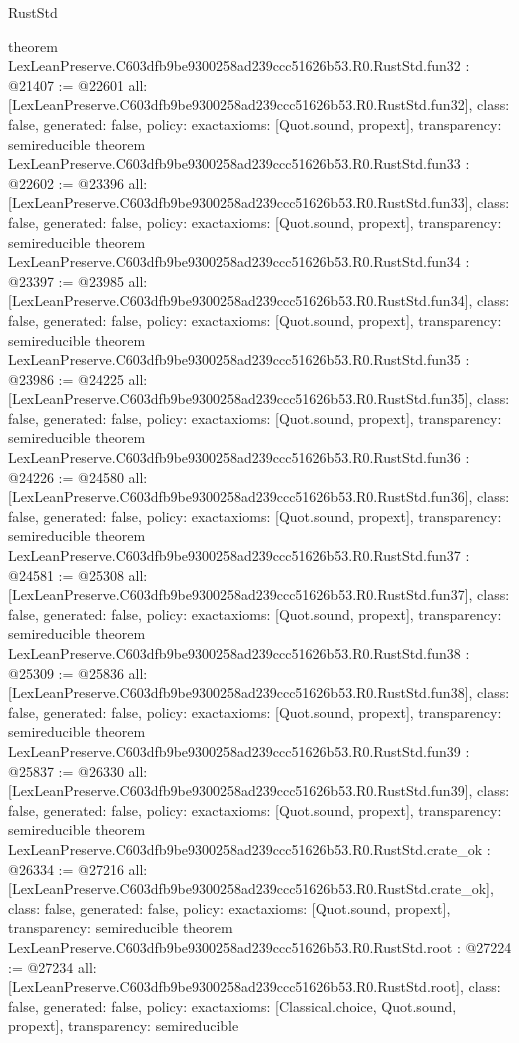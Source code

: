 \begin{lexlean}{RustStd}
\begin{coremodule}
{}
theorem LexLeanPreserve.C603dfb9be9300258ad239ccc51626b53.R0.RustStd.fun32 : @21407 := @22601 {
  all: [LexLeanPreserve.C603dfb9be9300258ad239ccc51626b53.R0.RustStd.fun32],
  class: false,
  generated: false,
  policy: exact{axioms: [Quot.sound, propext]},
  transparency: semireducible
}
theorem LexLeanPreserve.C603dfb9be9300258ad239ccc51626b53.R0.RustStd.fun33 : @22602 := @23396 {
  all: [LexLeanPreserve.C603dfb9be9300258ad239ccc51626b53.R0.RustStd.fun33],
  class: false,
  generated: false,
  policy: exact{axioms: [Quot.sound, propext]},
  transparency: semireducible
}
theorem LexLeanPreserve.C603dfb9be9300258ad239ccc51626b53.R0.RustStd.fun34 : @23397 := @23985 {
  all: [LexLeanPreserve.C603dfb9be9300258ad239ccc51626b53.R0.RustStd.fun34],
  class: false,
  generated: false,
  policy: exact{axioms: [Quot.sound, propext]},
  transparency: semireducible
}
theorem LexLeanPreserve.C603dfb9be9300258ad239ccc51626b53.R0.RustStd.fun35 : @23986 := @24225 {
  all: [LexLeanPreserve.C603dfb9be9300258ad239ccc51626b53.R0.RustStd.fun35],
  class: false,
  generated: false,
  policy: exact{axioms: [Quot.sound, propext]},
  transparency: semireducible
}
theorem LexLeanPreserve.C603dfb9be9300258ad239ccc51626b53.R0.RustStd.fun36 : @24226 := @24580 {
  all: [LexLeanPreserve.C603dfb9be9300258ad239ccc51626b53.R0.RustStd.fun36],
  class: false,
  generated: false,
  policy: exact{axioms: [Quot.sound, propext]},
  transparency: semireducible
}
theorem LexLeanPreserve.C603dfb9be9300258ad239ccc51626b53.R0.RustStd.fun37 : @24581 := @25308 {
  all: [LexLeanPreserve.C603dfb9be9300258ad239ccc51626b53.R0.RustStd.fun37],
  class: false,
  generated: false,
  policy: exact{axioms: [Quot.sound, propext]},
  transparency: semireducible
}
theorem LexLeanPreserve.C603dfb9be9300258ad239ccc51626b53.R0.RustStd.fun38 : @25309 := @25836 {
  all: [LexLeanPreserve.C603dfb9be9300258ad239ccc51626b53.R0.RustStd.fun38],
  class: false,
  generated: false,
  policy: exact{axioms: [Quot.sound, propext]},
  transparency: semireducible
}
theorem LexLeanPreserve.C603dfb9be9300258ad239ccc51626b53.R0.RustStd.fun39 : @25837 := @26330 {
  all: [LexLeanPreserve.C603dfb9be9300258ad239ccc51626b53.R0.RustStd.fun39],
  class: false,
  generated: false,
  policy: exact{axioms: [Quot.sound, propext]},
  transparency: semireducible
}
theorem LexLeanPreserve.C603dfb9be9300258ad239ccc51626b53.R0.RustStd.crate_ok : @26334 := @27216 {
  all: [LexLeanPreserve.C603dfb9be9300258ad239ccc51626b53.R0.RustStd.crate_ok],
  class: false,
  generated: false,
  policy: exact{axioms: [Quot.sound, propext]},
  transparency: semireducible
}
theorem LexLeanPreserve.C603dfb9be9300258ad239ccc51626b53.R0.RustStd.root : @27224 := @27234 {
  all: [LexLeanPreserve.C603dfb9be9300258ad239ccc51626b53.R0.RustStd.root],
  class: false,
  generated: false,
  policy: exact{axioms: [Classical.choice, Quot.sound, propext]},
  transparency: semireducible
}


\end{coremodule}
\end{lexlean}
